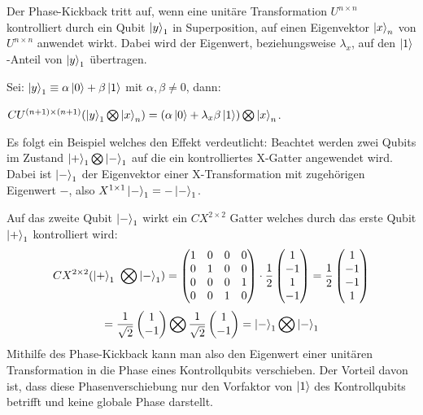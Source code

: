 Der Phase-Kickback tritt auf,
wenn eine unitäre Transformation \(U^{n\times n}\) kontrolliert durch ein Qubit \(\ket{y}_1\) in Superposition, 
auf einen Eigenvektor \(\ket{x}_n\) von \(U^{n\times n}\) anwendet wirkt.
Dabei wird der Eigenwert, beziehungsweise \(\lambda_x\), auf den \(\ket{1}\)-Anteil von \(\ket{y}_1\)
übertragen.

Sei: \(\ket{y}_1 \equiv \alpha\ket{0} + \beta\ket{1}\) mit \(\alpha,\beta \neq 0\), 
dann:

\(CU^{(n+1)\times (n+1)}(\ket{y}_1\operatorname{\bigotimes}\ket{x}_n)=(\alpha\ket{0} + \lambda_x\beta\ket{1})\operatorname{\bigotimes}\ket{x}_n\).

Es folgt ein Beispiel welches den Effekt verdeutlicht:
Beachtet werden zwei Qubits im Zustand \(\ket{+}_1 \operatorname{\bigotimes} \ket{-}_1\) auf die ein kontrolliertes X-Gatter angewendet wird.
Dabei ist \(\ket{-}_1\) der Eigenvektor einer X-Transformation mit zugehörigen Eigenwert \(-\), also \(X^{1\times 1}\ket{-}_1=-\ket{-}_1\).

Auf das zweite Qubit \(\ket{-}_1\) wirkt ein \(CX^{2\times 2}\) Gatter welches durch das erste Qubit \(\ket{+}_1\) kontrolliert wird:
\[
  CX^{2\times 2}( \ket{+}_1\ \operatorname{\bigotimes} \ket{-}_1) =
  \begin{pmatrix}
    1 & 0 & 0 & 0\\
    0 & 1 & 0 & 0\\
    0 & 0 & 0 & 1\\
    0 & 0 & 1 & 0
  \end{pmatrix}
  \cdot
  \frac{1}{{2}}
  \begin{pmatrix}
    1 \\
    -1 \\
    1 \\
    -1 
  \end{pmatrix}
  =
  \frac{1}{{2}}
  \begin{pmatrix}
    1 \\
    -1 \\
    -1 \\
    1 
  \end{pmatrix}
  \]
  \[
  =
  \frac{1}{{\sqrt{2}}}
  \begin{pmatrix}
    1 \\
    -1 
  \end{pmatrix}
  \operatorname{\bigotimes}
  \frac{1}{{\sqrt{2}}}
  \begin{pmatrix}
    1 \\
    -1 
  \end{pmatrix}
  =
  \ket{-}_1 \operatorname{\bigotimes} \ket{-}_1
  \]
Mithilfe des Phase-Kickback kann man also den Eigenwert einer unitären Transformation in die Phase eines Kontrollqubits verschieben.
Der Vorteil davon ist, dass diese Phasenverschiebung nur den Vorfaktor von \(\ket{1}\) des Kontrollqubits betrifft und keine globale Phase darstellt.

